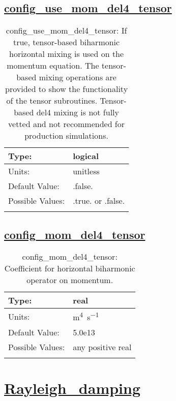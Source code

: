 \subsection[config\_use\_mom\_del4\_tensor]{\hyperref[sec:nm_tab_hmix_del4_tensor]{config\_use\_mom\_del4\_tensor}}
\label{subsec:nm_sec_config_use_mom_del4_tensor}
\begin{center}
\begin{longtable}{| p{2.0in} || p{4.0in} |}
    \hline
    Type: & logical \\
    \hline
    Units: & \si{unitless} \\
    \hline
    Default Value: & .false. \\
    \hline
    Possible Values: & .true. or .false. \\
    \hline
    \caption{config\_use\_mom\_del4\_tensor: If true, tensor-based biharmonic horizontal mixing is used on the momentum equation. The tensor-based mixing operations are provided to show the functionality of the tensor subroutines. Tensor-based del4 mixing is not fully vetted and not recommended for production simulations.}
\end{longtable}
\end{center}
\subsection[config\_mom\_del4\_tensor]{\hyperref[sec:nm_tab_hmix_del4_tensor]{config\_mom\_del4\_tensor}}
\label{subsec:nm_sec_config_mom_del4_tensor}
\begin{center}
\begin{longtable}{| p{2.0in} || p{4.0in} |}
    \hline
    Type: & real \\
    \hline
    Units: & \si{m^4.s^{-1}} \\
    \hline
    Default Value: & 5.0e13 \\
    \hline
    Possible Values: & any positive real \\
    \hline
    \caption{config\_mom\_del4\_tensor: Coefficient for horizontal biharmonic operator on momentum.}
\end{longtable}
\end{center}
\section[Rayleigh\_damping]{\hyperref[sec:nm_tab_Rayleigh_damping]{Rayleigh\_damping}}
\label{sec:nm_sec_Rayleigh_damping}
